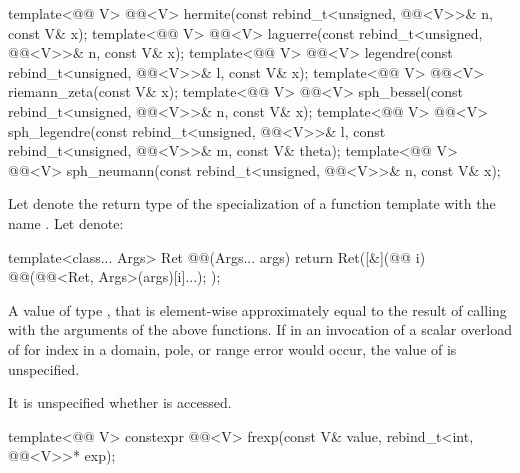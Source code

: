 \begin{itemdecl}
template<@@ V> @@<V> hermite(const rebind_t<unsigned,
@@<V>>& n, const V& x);
template<@@ V> @@<V> laguerre(const rebind_t<unsigned,
@@<V>>& n, const V& x);
template<@@ V> @@<V> legendre(const rebind_t<unsigned,
@@<V>>& l, const V& x);
template<@@ V> @@<V> riemann_zeta(const V& x);
template<@@ V> @@<V> sph_bessel(const rebind_t<unsigned,
@@<V>>& n, const V& x);
template<@@ V>
  @@<V> sph_legendre(const rebind_t<unsigned, @@<V>>& l,
                                 const rebind_t<unsigned, @@<V>>& m,
                                 const V& theta);
template<@@ V> @@<V> sph_neumann(const rebind_t<unsigned,
@@<V>>& n, const V& x);
\end{itemdecl}

\begin{itemdescr}
\pnum
Let  denote the return type of the specialization of a function
template with the name .
Let  denote:
\begin{codeblock}
template<class... Args>
Ret @@(Args... args) {
  return Ret([&](@@ i) {
      @@(@@<Ret, Args>(args)[i]...);
  });
}
\end{codeblock}

\pnum
\returns
A value  of type , that is element-wise approximately
equal to the result of calling  with the arguments
of the above functions.
If in an invocation of a scalar overload of  for index
 in  a domain, pole, or range error would
occur, the value of  is unspecified.

\pnum
\remarks
It is unspecified whether  is accessed.
\end{itemdescr}

\begin{itemdecl}
template<@@ V>
  constexpr @@<V> frexp(const V& value, rebind_t<int, @@<V>>* exp);
\end{itemdecl}

